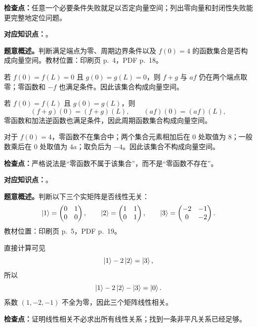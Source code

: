 \textbf{检查点：}任意一个必要条件失败就足以否定向量空间；列出零向量和封闭性失败能更完整地定位问题。


\textbf{对应知识点：}。

\textbf{题意概述。}判断满足端点为零、周期边界条件以及 $f(0)=4$ 的函数集合是否构成向量空间。教材位置：印刷页 p.~4，PDF p.~18。

\begin{checkedsolution}
若 $f(0)=f(L)=0$ 且 $g(0)=g(L)=0$，则 $f+g$ 与 $af$ 仍在两个端点取零；零函数和 $-f$ 也满足条件。因此该集合构成向量空间。

若 $f(0)=f(L)$ 且 $g(0)=g(L)$，则
\[
  (f+g)(0)=(f+g)(L),\qquad
  (af)(0)=(af)(L),
\]
零函数和加法逆函数也满足条件，因此周期函数集合构成向量空间。

对于 $f(0)=4$，零函数不在集合中；两个集合元素相加后在 $0$ 处取值为 $8$；一般数乘后在 $0$ 处取值为 $4a$；取负后为 $-4$。因此该集合不构成向量空间。
\end{checkedsolution}

\textbf{检查点：}严格说法是“零函数不属于该集合”，而不是“零函数不存在”。


\textbf{对应知识点：}。

\textbf{题意概述。}判断以下三个实矩阵是否线性无关：
\[
  \left|1\right\rangle=\begin{pmatrix}0&1\\0&0\end{pmatrix},\qquad
  \left|2\right\rangle=\begin{pmatrix}1&1\\0&1\end{pmatrix},\qquad
  \left|3\right\rangle=\begin{pmatrix}-2&-1\\0&-2\end{pmatrix}.
\]
教材位置：印刷页 p.~5，PDF p.~19。

\begin{checkedsolution}
直接计算可见
\[
  \left|1\right\rangle-2\left|2\right\rangle=\left|3\right\rangle,
\]
所以
\[
  \left|1\right\rangle-2\left|2\right\rangle-\left|3\right\rangle=\left|0\right\rangle.
\]
系数 $(1,-2,-1)$ 不全为零，因此三个矩阵线性相关。
\end{checkedsolution}

\textbf{检查点：}证明线性相关不必求出所有线性关系；找到一条非平凡关系已经足够。

